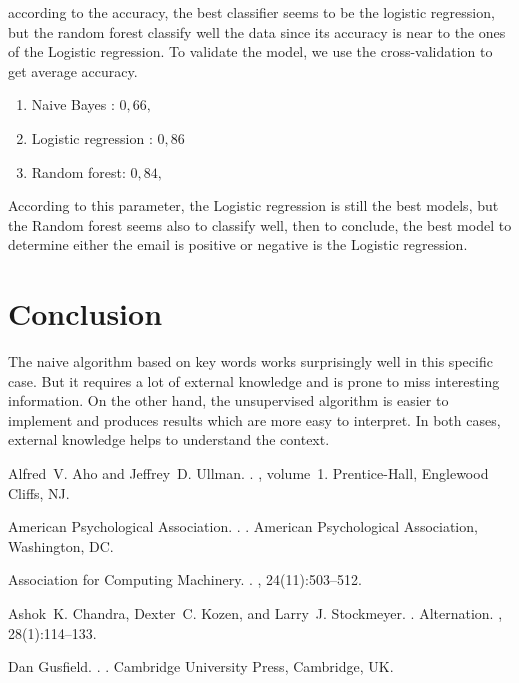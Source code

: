 \documentclass[11pt]{article}
\begin{document}
according to the accuracy, the best classifier seems to be the logistic regression, but the random forest classify well the data since its accuracy is near to the ones of the Logistic regression. To validate the model, we use the cross-validation to get average accuracy.

\begin{enumerate}
    \item Naive Bayes : $0,66,$
    \item Logistic regression : $0,86$ 
    \item Random forest: $0,84,$
\end{enumerate}

According to this parameter, the Logistic regression is still the best models, but the Random forest seems also to classify well, then to conclude, the best model to determine either the email is positive or negative is the Logistic regression.

\section{Conclusion}

The naive algorithm based on key words works surprisingly well in this specific case. But it requires a lot of external knowledge and is prone to miss interesting information. On the other hand, the unsupervised algorithm is easier to implement and produces results which are more easy to interpret. In both cases, external knowledge helps to understand the context.

\begin{thebibliography}{}

Alfred~V. Aho and Jeffrey~D. Ullman.
.
, volume~1.
\newblock Prentice-{Hall}, Englewood Cliffs, NJ.

{American Psychological Association}.
.
.
\newblock American Psychological Association, Washington, DC.

{Association for Computing Machinery}.
.
, 24(11):503--512.

Ashok~K. Chandra, Dexter~C. Kozen, and Larry~J. Stockmeyer.
.
\newblock Alternation.
,
  28(1):114--133.

Dan Gusfield.
.
.
\newblock Cambridge University Press, Cambridge, UK.

\end{thebibliography}
\end{document}
